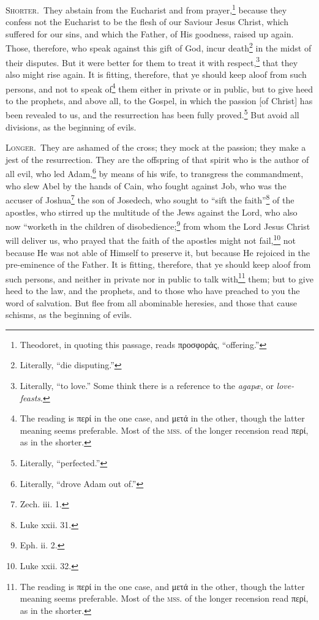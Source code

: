 
\textsc{Shorter.}~They abstain from the Eucharist and from prayer,\footnote{Theodoret, in quoting this passage, reads \textgreek{προσφοράς}, “offering.”} because they confess not the Eucharist to be the flesh of our Saviour Jesus Christ, which suffered for our sins, and which the Father, of His goodness, raised up again. Those, therefore, who speak against this gift of God, incur death\footnote{Literally, “die disputing.”} in the midst of their disputes. But it were better for them to treat it with respect,\footnote{Literally, “to love.” Some think there is a reference to the \emph{agapæ}, or \emph{love-feasts}.} that they also might rise again. It is fitting, therefore, that ye should keep aloof from such persons, and not to speak of\footnote{The reading is \textgreek{περί} in the one case, and \textgreek{μετά} in the other, though the latter meaning seems preferable. Most of the \textsc{mss.} of the longer recension read \textgreek{περί}, as in the shorter.} them either in private or in public, but to give heed to the prophets, and above all, to the Gospel, in which the passion [of Christ] has been revealed to us, and the resurrection has been fully proved.\footnote{Literally, “perfected.”} But avoid all divisions, as the beginning of evils.

\textsc{Longer.}~They are ashamed of the cross; they mock at the passion; they make a jest of the resurrection. They are the offspring of that spirit who is the author of all evil, who led Adam,\footnote{Literally, “drove Adam out of.”} by means of his wife, to transgress the commandment, who slew Abel by the hands of Cain, who fought against Job, who was the accuser of Joshua\footnote{Zech. iii. 1.} the son of Josedech, who sought to “sift the faith”\footnote{Luke xxii. 31.} of the apostles, who stirred up the multitude of the Jews against the Lord, who also now “worketh in the children of disobedience;\footnote{Eph. ii. 2.} from whom the Lord Jesus Christ will deliver us, who prayed that the faith of the apostles might not fail,\footnote{Luke xxii. 32.} not because He was not able of Himself to preserve it, but because He rejoiced in the pre-eminence of the Father. It is fitting, therefore, that ye should keep aloof from such persons, and neither in private nor in public to talk with\footnote{The reading is \textgreek{περί} in the one case, and \textgreek{μετά} in the other, though the latter meaning seems preferable. Most of the \textsc{mss.} of the longer recension read \textgreek{περί}, as in the shorter.} them; but to give heed to the law, and the prophets, and to those who have preached to you the word of salvation. But flee from all abominable heresies, and those that cause schisms, as the beginning of evils.

